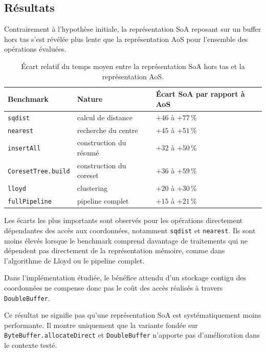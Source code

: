 \subsection{Résultats}

Contrairement à l'hypothèse initiale, la représentation SoA reposant sur un buffer hors tas s'est révélée plus lente que la représentation AoS pour l'ensemble des opérations évaluées.

\begin{table}[ht]
\centering
\small
\begin{tabular}{lll}
\toprule
\textbf{Benchmark} &
\textbf{Nature} &
\textbf{Écart SoA par rapport à AoS} \\
\midrule
\texttt{sqdist}
    & calcul de distance
    & \(+46\) à \(+77\,\%\) \\
\texttt{nearest}
    & recherche du centre
    & \(+45\) à \(+51\,\%\) \\
\texttt{insertAll}
    & construction du résumé
    & \(+32\) à \(+50\,\%\) \\
\texttt{CoresetTree.build}
    & construction du coreset
    & \(+36\) à \(+59\,\%\) \\
\texttt{lloyd}
    & clustering
    & \(+20\) à \(+30\,\%\) \\
\texttt{fullPipeline}
    & pipeline complet
    & \(+15\) à \(+21\,\%\) \\
\bottomrule
\end{tabular}
\caption{Écart relatif du temps moyen entre la représentation SoA hors tas et la représentation AoS.}
\label{tab:jmh-soa-vs-aos}
\end{table}

Les écarts les plus importants sont observés pour les opérations directement dépendantes des accès aux coordonnées, notamment \texttt{sqdist} et \texttt{nearest}. Ils sont moins élevés lorsque le benchmark comprend davantage de traitements qui ne dépendent pas directement de la représentation mémoire, comme dans l'algorithme de Lloyd ou le pipeline complet.

Dans l'implémentation étudiée, le bénéfice attendu d'un stockage contigu des coordonnées ne compense donc pas le coût des accès réalisés à travers \texttt{DoubleBuffer}.

Ce résultat ne signifie pas qu'une représentation SoA est systématiquement moins performante. Il montre uniquement que la variante fondée sur \texttt{ByteBuffer.allocateDirect} et \texttt{DoubleBuffer} n'apporte pas d'amélioration dans le contexte testé.

